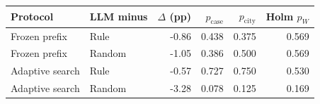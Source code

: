 \begin{tabular}{llrrrr}
\toprule
Protocol & LLM minus & $\Delta$ (pp) & $p_{\mathrm{case}}$ & $p_{\mathrm{city}}$ & Holm $p_W$ \\
\midrule
Frozen prefix & Rule & -0.86 & 0.438 & 0.375 & 0.569 \\
Frozen prefix & Random & -1.05 & 0.386 & 0.500 & 0.569 \\
Adaptive search & Rule & -0.57 & 0.727 & 0.750 & 0.530 \\
Adaptive search & Random & -3.28 & 0.078 & 0.125 & 0.169 \\
\bottomrule
\end{tabular}
